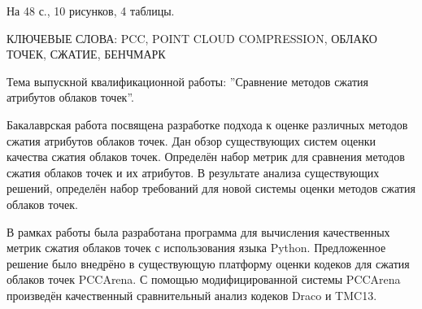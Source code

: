 На 48 с., 10 рисунков, 4 таблицы.

КЛЮЧЕВЫЕ СЛОВА: PCC, POINT CLOUD COMPRESSION, ОБЛАКО ТОЧЕК, СЖАТИЕ, БЕНЧМАРК

Тема выпускной квалификационной работы: ''Сравнение методов сжатия атрибутов облаков точек''.

Бакалаврская работа посвящена разработке подхода к оценке различных методов
сжатия атрибутов облаков точек. Дан обзор существующих систем оценки качества
сжатия облаков точек. Определён набор метрик для сравнения методов сжатия
облаков точек и их атрибутов. В результате анализа существующих решений,
определён набор требований для новой системы оценки методов сжатия облаков
точек.

В рамках работы была разработана программа для вычисления качественных метрик
сжатия облаков точек с использования языка Python. Предложенное решение было
внедрёно в существующую платформу оценки кодеков для сжатия облаков точек
PCCArena. С помощью модифицированной системы PCCArena произведён качественный
сравнительный анализ кодеков Draco и TMC13.
